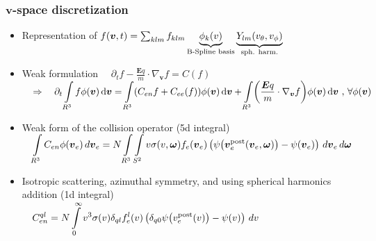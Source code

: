 \documentclass[mathserif, aspectratio=169]{beamer}
\newcommand{\ud}{\,\mathrm{d}}
\newcommand{\vect}[1]{\boldsymbol{#1}}
\newcommand{\of}[1]{\mleft( #1 \mright)}
\newcommand{\myint}{\int\limits}
\newcommand{\diff}[1]{\, d#1}
\begin{document}
\begin{frame}
	\frametitle{$\vect{v}$-space discretization}
	\small
	\begin{itemize}
		\item Representation of $f\of{\vect{v},t} = \sum_{klm} f_{klm} \underbrace{\phi_k\of{v}}_{\text{B-Spline basis}} \underbrace{Y_{lm}\of{v_\theta, v_\phi}}_{\tiny\text{sph. harm.}}$ 
		\item Weak formulation
			$
			\displaystyle
			\quad
			\partial_t f - \frac{\vect{E} q}{m} \cdot \nabla_{\vect{v}}f = C(f)
			\quad $ \\
			$
			\displaystyle
			\quad
			\Rightarrow \quad
			\partial_t \myint_{R^3} f \phi\of{\vect{v}} \ud \vect{v} = 
			\myint_{R^3} \of{C_{en}f + C_{ee}(f)} \phi\of{\vect{v}} \ud \vect{v} + \myint_{R^3} \of{\frac{\vect{E} q}{m} \cdot \nabla_{\vect{v}} f} \phi(\vect{v}) \ud \vect{v}\text{ , } 
			\forall \phi(\vect{v})$
		\item Weak form of the collision operator (5d integral) \\
			$
			\displaystyle
			\quad 
			\myint_{R^3} C_{en} \phi\of{\vect{v}_e} \diff{\vect{v}_e} 
			=
			N \myint_{R^3} \myint_{S^2} 
			v\sigma(v,\vect{\omega})
			f_e\of{\vect{v}_e}
			\left(
			\psi\of{\vect{v}_e^\text{post}\of{\vect{v}_e, \vect{\omega}}} 
			- \psi\of{\vect{v}_e} 
			\right)
			\diff{\vect{v}_e} \diff{\vect{\omega}}
			$
		\item Isotropic scattering, azimuthal symmetry, and using spherical harmonics addition (1d integral)\\
		$
		\displaystyle
		\quad 
		C_{en}^{ql} 
		=
		N \myint_{0}^{\infty} 
		v^3\sigma(v)\delta_{ql}
		f_e^{l}\of{v}
		\left(
		\delta_{q0}\psi\of{v_e^\text{post}\of{v}} - \psi\of{v} 
		\right)
		\diff{v} 
		$ 
	\end{itemize}
\end{frame}
\end{document}
